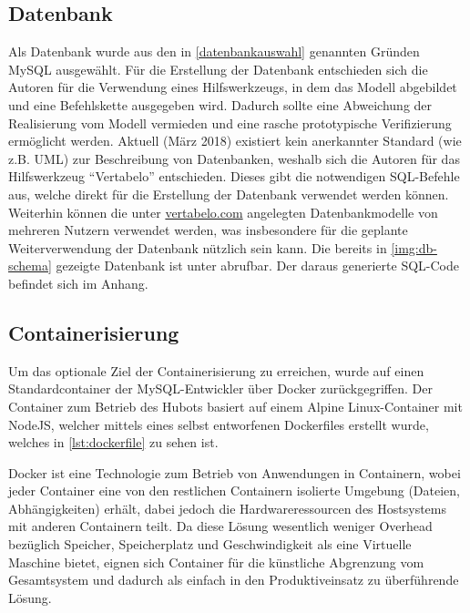 \subsection{Datenbank}

Als Datenbank wurde aus den in \autoref{datenbankauswahl} genannten Gründen MySQL ausgewählt.
Für die Erstellung der Datenbank entschieden sich die Autoren für die Verwendung eines Hilfswerkzeugs, in dem das Modell abgebildet und eine Befehlskette ausgegeben wird. Dadurch sollte eine Abweichung der Realisierung vom Modell vermieden und eine rasche prototypische Verifizierung ermöglicht werden. Aktuell (März 2018) existiert kein anerkannter Standard (wie z.B. UML) zur Beschreibung von Datenbanken, weshalb sich die Autoren für das Hilfswerkzeug \enquote{Vertabelo} entschieden. Dieses gibt die notwendigen SQL-Befehle aus, welche direkt für die Erstellung der Datenbank verwendet werden können. Weiterhin können die unter \url{vertabelo.com} angelegten Datenbankmodelle von mehreren Nutzern verwendet werden, was insbesondere für die geplante Weiterverwendung der Datenbank nützlich sein kann.
Die bereits in \autoref{img:db-schema} gezeigte Datenbank ist unter \cite{VertabeloDesignYourDatabase2018} abrufbar. Der daraus generierte SQL-Code befindet sich im Anhang.


\subsection{Containerisierung}

Um das optionale Ziel der Containerisierung zu erreichen, wurde auf einen Standardcontainer der MySQL-Entwickler über Docker zurückgegriffen. Der Container zum Betrieb des Hubots basiert auf einem Alpine Linux-Container mit NodeJS, welcher mittels eines selbst entworfenen Dockerfiles erstellt wurde, welches in \autoref{lst:dockerfile} zu sehen ist.


Docker ist eine Technologie zum Betrieb von Anwendungen in Containern, wobei jeder Container eine von den restlichen Containern isolierte Umgebung (Dateien, \linebreak Abhängigkeiten) erhält, dabei jedoch die Hardwareressourcen des Hostsystems mit anderen Containern teilt. Da diese Lösung wesentlich weniger Overhead bezüglich Speicher, Speicherplatz und Geschwindigkeit als eine Virtuelle Maschine bietet, eignen sich Container für die künstliche Abgrenzung vom Gesamtsystem und dadurch als einfach in den Produktiveinsatz zu überführende Lösung.

